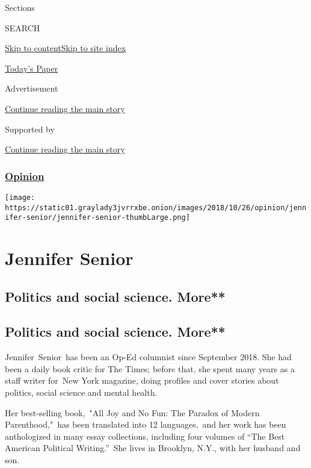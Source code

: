 Sections

SEARCH

\protect\hyperlink{site-content}{Skip to
content}\protect\hyperlink{site-index}{Skip to site index}

\href{https://myaccount.nytimes3xbfgragh.onion/auth/login?response_type=cookie\&client_id=vi}{}

\href{https://www.nytimes3xbfgragh.onion/section/todayspaper}{Today's
Paper}

Advertisement

\protect\hyperlink{after-top}{Continue reading the main story}

Supported by

\protect\hyperlink{after-sponsor}{Continue reading the main story}

\hypertarget{opinion}{%
\subsubsection{\texorpdfstring{\href{/section/opinion}{Opinion}}{Opinion}}\label{opinion}}

\texttt{[image: https://static01.graylady3jvrrxbe.onion/images/2018/10/26/opinion/jennifer-senior/jennifer-senior-thumbLarge.png]}

\hypertarget{jennifer-senior}{%
\section{Jennifer Senior}\label{jennifer-senior}}

\hypertarget{politics-and-social-science-more}{%
\subsection{Politics and social science.
More**}\label{politics-and-social-science-more}}

\hypertarget{politics-and-social-science-more-1}{%
\subsection{Politics and social science.
More**}\label{politics-and-social-science-more-1}}

Jennifer~Senior~has been an Op-Ed columnist since September 2018. She
had been a daily book critic for The Times; before that, she spent many
years as a staff writer for~New York magazine, doing profiles and cover
stories about politics, social science and mental health.~

Her best-selling book,~"All Joy and No Fun: The Paradox of Modern
Parenthood,"~has been translated into 12 languages,~and her work has
been anthologized in many essay collections, including four volumes of
``The Best American Political Writing.''~She lives in Brooklyn, N.Y.,
with her husband and son.~

